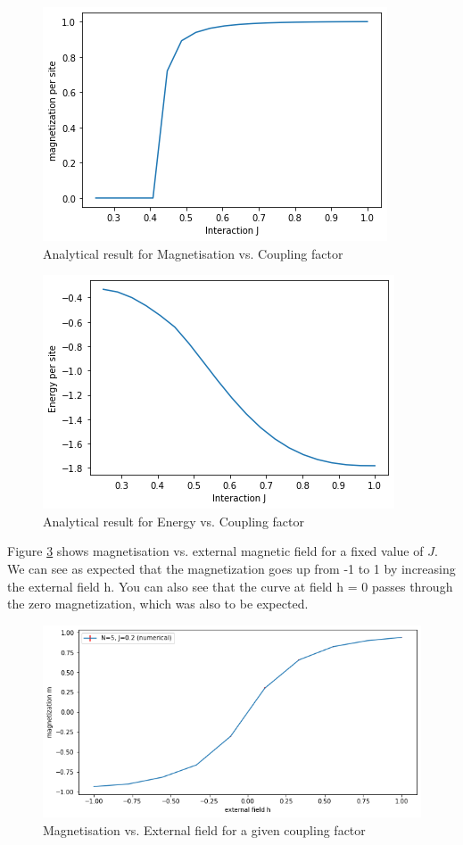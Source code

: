\documentclass{article}
\begin{document}
\begin{figure}[h!]
    \centering
    \includegraphics[width=.6\textwidth]{mag-int-analy.png}
    \caption{Analytical result for Magnetisation vs. Coupling factor}
    \label{fig:mag-int-analy}
\end{figure}
\begin{figure}[h!]
    \centering
    \includegraphics[width=.6\textwidth]{energy-int-analy.png}
    \caption{Analytical result for Energy vs. Coupling factor}
    \label{fig:energy-int-analy}
\end{figure} 

Figure \ref{fig:mag-h} shows magnetisation vs. external magnetic field for a fixed value of $J$. 
We can see as expected that the magnetization goes up from -1 to 1 by increasing the external field h. You can also see that the curve at field h = 0 passes through the zero magnetization, which was also to be expected. \\

\begin{figure}[h!]
    \centering
    \includegraphics[width=.7\textwidth]{mag-h.png}
    \caption{Magnetisation vs. External field for a given coupling factor}
    \label{fig:mag-h}
\end{figure}
\end{document}
